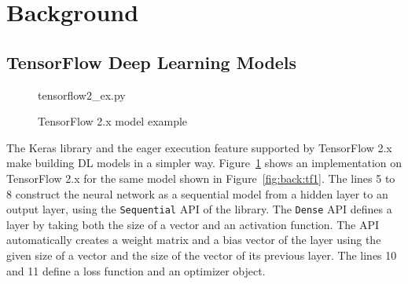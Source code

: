 \section{Background}\label{sec:background}

\subsection{TensorFlow Deep Learning Models}


\begin{figure}[ht!]
  
{tensorflow2_ex.py}
  \caption{TensorFlow 2.x model example}
\label{fig:back:tf2}
\end{figure}

The Keras library and the eager execution feature supported by TensorFlow 2.x
make building DL models in a simpler way.
Figure~\ref{fig:back:tf2} shows an implementation on TensorFlow 2.x for the
same model shown in Figure~\ref{fig:back:tf1}.
The lines 5 to 8 construct the neural network as a sequential model from a
hidden layer to an output layer, using the {\tt Sequential} API of the
library.
The {\tt Dense} API defines a layer by taking both the size of a vector and an
activation function. 
The API automatically creates a weight matrix and a bias vector of the layer
using the given size of a vector and the size of the vector of its previous
layer.
The lines 10 and 11 define a loss function and an optimizer object.  
